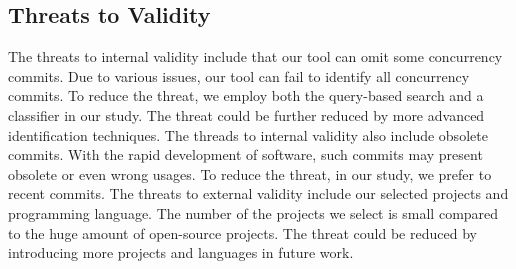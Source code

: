 
\subsection{Threats to Validity}

The threats to internal validity include that our tool can omit some concurrency commits. Due to various issues, our tool can fail to identify all concurrency commits. To reduce the threat, we employ both the query-based search and a classifier in our study. The threat could be further reduced by more advanced identification techniques. The threads to internal validity also include obsolete commits. With the rapid development of software, such commits may present obsolete or even wrong usages. To reduce the threat, in our study, we prefer to recent commits. The threats to external validity include our selected projects and programming language. The number of the projects we select is small compared to the huge amount of open-source projects. The threat could be reduced by introducing more projects and languages in future work.

